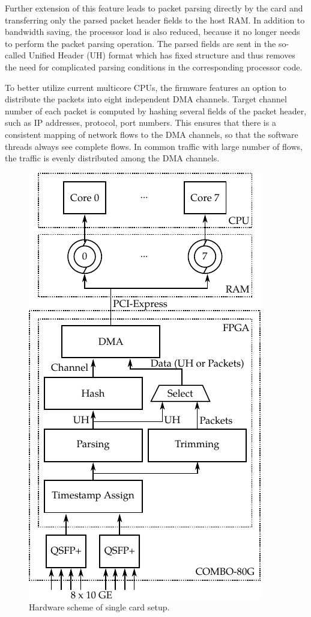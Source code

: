 Further extension of this feature leads to packet parsing directly by the card and transferring only the parsed packet header fields to the host RAM. In addition to bandwidth saving, the processor load is also reduced, because it no longer needs to perform the packet parsing operation. The parsed fields are sent in the so-called Unified Header (UH) format which has fixed structure and thus removes the need for complicated parsing conditions in the corresponding processor code.

To better utilize current multicore CPUs, the firmware features an option to distribute the packets into eight independent DMA channels. Target channel number of each packet is computed by hashing several fields of the packet header, such as IP addresses, protocol, port numbers. This ensures that there is a consistent mapping of network flows to the DMA channels, so that the software threads always see complete flows. In common traffic with large number of flows, the traffic is evenly distributed among the DMA channels.

\begin{figure}[t]
    \centering 
    \includegraphics{figures/paper-highdensity/fig/hw}
    \caption{Hardware scheme of single card setup.}
    \label{fig:hw}
\end{figure}

